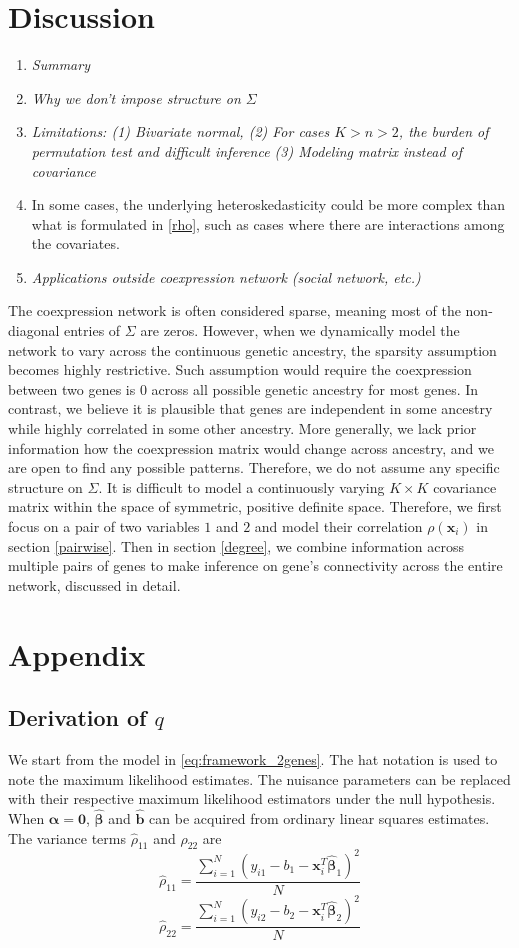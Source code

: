 \documentclass[aoas,preprint]{imsart}
\numberwithin{equation}{section}
\theoremstyle{plain}
\begin{document}
\section{Discussion}
\begin{enumerate}
        \item \textit{Summary}
        \item \textit{Why we don't impose structure on $\Sigma$}
        \item \textit{Limitations: (1) Bivariate normal, (2) For cases $K>n>2$, the burden of permutation test and difficult inference (3) Modeling matrix instead of covariance}
        \item In some cases, the underlying heteroskedasticity could be more complex than what is formulated in \ref{rho}, such as cases where there are interactions among the covariates. 
        \item \textit{Applications outside coexpression network (social network, etc.)}
\end{enumerate}
 The coexpression network is often considered sparse, meaning most of the non-diagonal entries of $\Sigma$ are zeros. However, when we dynamically model the network to vary across the continuous genetic ancestry, the sparsity assumption becomes highly restrictive. Such assumption would require the coexpression between two genes is 0 across all possible genetic ancestry for most genes. In contrast, we believe it is plausible that genes are independent in some ancestry while highly correlated in some other ancestry. More generally, we lack prior information how the coexpression matrix would change across ancestry, and we are open to find any possible patterns. Therefore, we do not assume any specific structure on $\Sigma$. It is difficult to model a continuously varying $K \times K$ covariance matrix within the space of symmetric, positive definite space. Therefore, we first focus on a pair of two variables $1$ and $2$ and model their correlation $\rho(\bm{x}_i)$ in section \ref{pairwise}. Then in section \ref{degree}, we combine information across multiple pairs of genes to make inference on gene's connectivity across the entire network, discussed in detail.

 
 \pagebreak
 
\section{Appendix}
\subsection{Derivation of $q$}
We start from the model in \ref{eq:framework_2genes}. The hat notation is used to note the maximum likelihood estimates. The nuisance parameters can be replaced with their respective maximum likelihood estimators under the null hypothesis. When $\bm{\alpha} = \bm{0}$, $\hat{\bm{\beta}}$ and $\hat{\bm{b}}$ can be acquired from ordinary linear squares estimates. The variance terms $\hat{\rho}_{11}$ and $\hat{\rho}_{22}$ are
$$\hat{\rho}_{11} =  \frac{\sum_{i=1}^{N}(y_{i1} - b_1 - \bm{x}_i^T\bm{\hat{\beta}}_{1})^2}{N}$$
$$\hat{\rho}_{22}=  \frac{\sum_{i=1}^{N}(y_{i2} - b_2 - \bm{x}_i^T\bm{\hat{\beta}}_{2})^2}{N}$$
\end{document}
